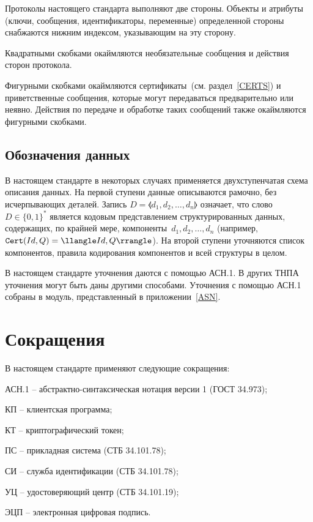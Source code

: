 Протоколы настоящего стандарта выполняют две стороны.
Объекты и атрибуты (ключи, сообщения, идентификаторы, переменные)
определенной стороны снабжаются нижним индексом,
указывающим на эту сторону.

Квадратными скобками окаймляются 
необязательные сообщения и действия сторон протокола.

Фигурными скобками окаймляются сертификаты~(см. раздел~\ref{CERTS})
и приветственные сообщения,
которые могут передаваться предварительно или неявно. 
Действия по передаче и обработке таких сообщений
также окаймляются фигурными скобками.

\subsection{Обозначения данных}

В настоящем стандарте в некоторых случаях применяется двухступенчатая 
схема описания данных. На первой ступени данные описываются рамочно, без 
исчерпывающих деталей. Запись $D = \llangle d_1, d_2,\ldots, d_n\rrangle$ 
означает, что слово $D \in\{0,1\}^*$ является кодовым представлением 
структурированных данных, содержащих, по крайней мере, 
компоненты~$d_1,d_2,\ldots,d_n$
(например, $\Cert(Id,Q)=\llangle Id,Q\rrangle$).
%
На второй ступени  уточняются список компонентов, правила кодирования
компонентов и всей структуры в целом.

В настоящем стандарте уточнения даются с помощью АСН.1.
В других ТНПА уточнения могут быть даны другими способами.
Уточнения с помощью АСН.1 собраны в модуль, представленный 
в приложении~\ref{ASN}. 

\section{Сокращения}

В настоящем стандарте применяют следующие сокращения:

АСН.1 -- абстрактно-синтаксическая нотация версии 1 (ГОСТ 34.973);

КП -- клиентская программа;

КТ -- криптографический токен;

ПС -- прикладная система (СТБ 34.101.78);

СИ -- служба идентификации (СТБ 34.101.78);

УЦ -- удостоверяющий центр (СТБ 34.101.19);

ЭЦП -- электронная цифровая подпись.

